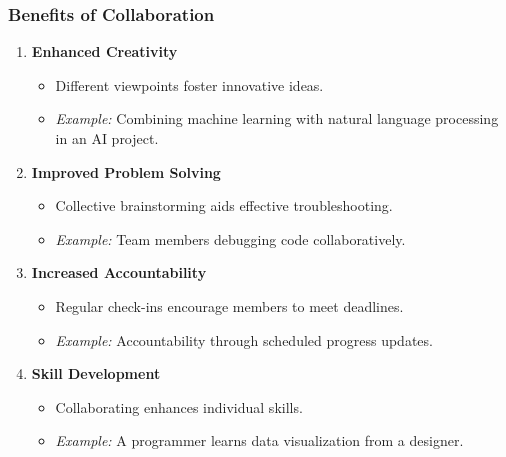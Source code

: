 \documentclass[aspectratio=169]{beamer}
\begin{document}
\begin{frame}[fragile]
    \frametitle{Benefits of Collaboration}
    \begin{enumerate}
        \item \textbf{Enhanced Creativity} 
            \begin{itemize}
                \item Different viewpoints foster innovative ideas.
                \item \textit{Example:} Combining machine learning with natural language processing in an AI project.
            \end{itemize}
        
        \item \textbf{Improved Problem Solving}
            \begin{itemize}
                \item Collective brainstorming aids effective troubleshooting.
                \item \textit{Example:} Team members debugging code collaboratively.
            \end{itemize}
        
        \item \textbf{Increased Accountability}
            \begin{itemize}
                \item Regular check-ins encourage members to meet deadlines.
                \item \textit{Example:} Accountability through scheduled progress updates.
            \end{itemize}

        \item \textbf{Skill Development}
            \begin{itemize}
                \item Collaborating enhances individual skills.
                \item \textit{Example:} A programmer learns data visualization from a designer.
            \end{itemize}
    \end{enumerate}
\end{frame}
\end{document}
